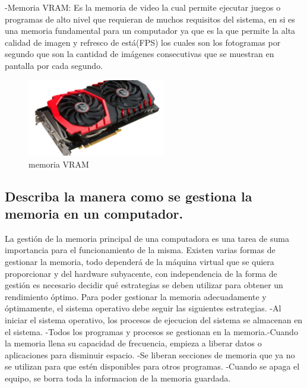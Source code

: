 \documentclass{article}
\begin{document}
-Memoria VRAM: Es la memoria de video la cual permite ejecutar juegos o programas de alto nivel que requieran de muchos requisitos del sistema, en si es una memoria fundamental para un computador ya que es la que permite la alta calidad de imagen y refresco de está(FPS) los cuales son los fotogramas por segundo que son la cantidad de imágenes consecutivas que se muestran en pantalla por cada segundo. \newline
\begin{figure}[h]
\includegraphics[width=6cm]{Vram.jpg}
\centering
\caption{memoria VRAM}
\end{figure}

\newpage
\subsection{Describa la manera como se gestiona la memoria en un computador.}

La  gestión  de  la  memoria  principal  de  una  computadora  es  una  tarea  de suma importancia para el funcionamiento de la misma. Existen varias formas de  gestionar  la  memoria,  todo dependerá  de  la máquina virtual que se quiera proporcionar y del hardware subyacente, con independencia de la forma de gestión es necesario decidir qué estrategias se deben utilizar para obtener un rendimiento óptimo. Para poder gestionar la memoria adecuadamente y  óptimamente, el  sistema  operativo  debe  seguir  las siguientes  estrategias. -Al iniciar el sistema operativo, los procesos de ejecucion del sistema se almacenan en el sistema. -Todos los programas y procesos se gestionan en la memoria.-Cuando la memoria llena su capacidad de frecuencia, empieza a liberar datos o aplicaciones para disminuir espacio. -Se liberan secciones de memoria que ya no se utilizan para que estén disponibles para otros programas. -Cuando se apaga el equipo, se borra toda la informacion de la memoria guardada.\newline
\end{document}
